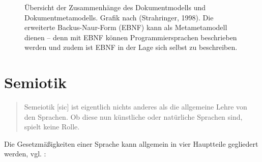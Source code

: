  
\begin{figure}[h!]
\centering
\advance\leftskip-2.5cm
\caption{ Übersicht der Zusammenhänge des Dokumentmodells und Dokumentmetamodells. Grafik nach (Strahringer, 1998). Die erweiterte Backus-Naur-Form (EBNF) kann als Metametamodell dienen -- denn mit EBNF können Programmiersprachen beschrieben werden und zudem ist EBNF in der Lage sich selbst zu beschreiben. }\label{metamodellschema}
\end{figure}
 
\section{Semiotik}\label{semiotik-sec}
 
\begin{quote}
 Semeiotik [sic] ist eigentlich nichts anderes als die allgemeine Lehre von den Sprachen. Ob diese nun künstliche oder natürliche Sprachen sind, spielt keine Rolle. \citep[S.~8]{Malissa}
\end{quote}
 
Die Gesetzmäßigkeiten einer Sprache kann allgemein in vier Hauptteile gegliedert werden, vgl. \citep[S.~8]{Malissa}:

